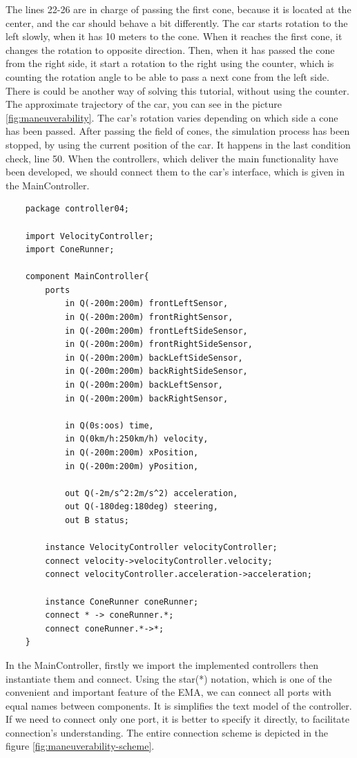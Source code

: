 \bigskip
The lines 22-26 are in charge of passing the first cone, because it is located at the center, and the car should behave a bit differently. The car starts rotation to the left slowly, when it has 10 meters to the cone. When it reaches the first cone, it changes the rotation to opposite direction. Then, when it has passed the cone from the right side, it start a rotation to the right using the counter, which is counting the rotation angle to be able to pass a next cone from the left side. There is could be another way of solving this tutorial, without using the counter. The approximate trajectory of the car, you can see in the picture \ref{fig:maneuverability}. The car's rotation varies depending on which side a cone has been passed. After passing the field of cones, the simulation process has been stopped, by using the current position of the car. It happens in the last condition check, line 50. When the controllers, which deliver the main functionality have been developed, we should connect them to the car's interface, which is given in the MainController.
\bigskip
\begin{lstlisting}
    package controller04;

    import VelocityController;
    import ConeRunner;
    
    component MainController{
        ports 
            in Q(-200m:200m) frontLeftSensor,
            in Q(-200m:200m) frontRightSensor,
            in Q(-200m:200m) frontLeftSideSensor,
            in Q(-200m:200m) frontRightSideSensor,
            in Q(-200m:200m) backLeftSideSensor,
            in Q(-200m:200m) backRightSideSensor,
            in Q(-200m:200m) backLeftSensor,
            in Q(-200m:200m) backRightSensor,
    
            in Q(0s:oos) time,
            in Q(0km/h:250km/h) velocity,
            in Q(-200m:200m) xPosition,
            in Q(-200m:200m) yPosition,
            
            out Q(-2m/s^2:2m/s^2) acceleration,
            out Q(-180deg:180deg) steering,
            out B status;
    
        instance VelocityController velocityController;
        connect velocity->velocityController.velocity;
        connect velocityController.acceleration->acceleration;
    
        instance ConeRunner coneRunner;
        connect * -> coneRunner.*;
        connect coneRunner.*->*; 
    }
\end{lstlisting}
\bigskip
In the MainController, firstly we import the implemented controllers then instantiate them and connect. Using the star(*) notation, which is one of the convenient and important feature of the EMA, we can connect all ports with equal names between components. It is simplifies the text model of the controller. If we need to connect only one port, it is better to specify it directly, to facilitate connection's understanding. The entire connection scheme is depicted in the figure \ref{fig:maneuverability-scheme}.
